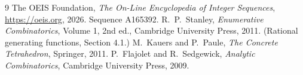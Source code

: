 \documentclass[11pt,a4paper]{article}
\theoremstyle{plain}
\theoremstyle{definition}
\begin{document}
\begin{thebibliography}{9}
 The OEIS Foundation, \emph{The On-Line Encyclopedia of Integer
Sequences}, \url{https://oeis.org}, 2026. Sequence A165392.
 R.~P.~Stanley, \emph{Enumerative Combinatorics}, Volume 1, 2nd ed.,
Cambridge University Press, 2011. (Rational generating functions, Section 4.1.)
 M.~Kauers and P.~Paule, \emph{The Concrete Tetrahedron}, Springer, 2011.
 P.~Flajolet and R.~Sedgewick, \emph{Analytic Combinatorics}, Cambridge
University Press, 2009.
\end{thebibliography}
\end{document}
